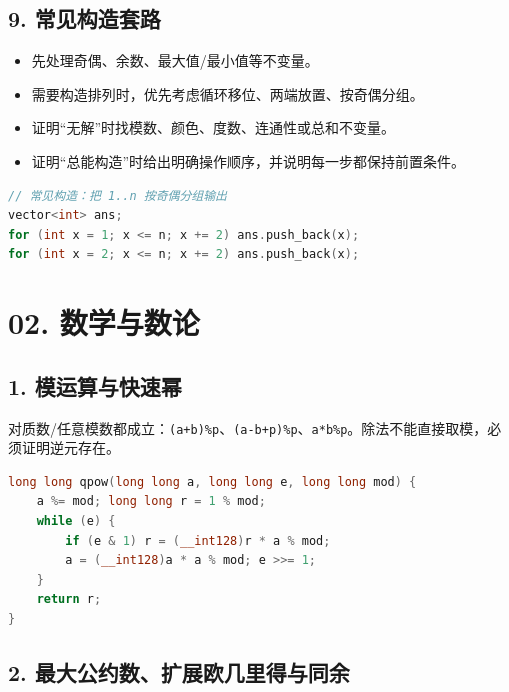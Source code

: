 \section{9. 常见构造套路}\label{ux5e38ux89c1ux6784ux9020ux5957ux8def}

\begin{itemize}
\tightlist
\item
  先处理奇偶、余数、最大值/最小值等不变量。
\item
  需要构造排列时，优先考虑循环移位、两端放置、按奇偶分组。
\item
  证明``无解''时找模数、颜色、度数、连通性或总和不变量。
\item
  证明``总能构造''时给出明确操作顺序，并说明每一步都保持前置条件。
\end{itemize}

\begin{lstlisting}[language={C++}]
// 常见构造：把 1..n 按奇偶分组输出
vector<int> ans;
for (int x = 1; x <= n; x += 2) ans.push_back(x);
for (int x = 2; x <= n; x += 2) ans.push_back(x);
\end{lstlisting}

\chapter{02. 数学与数论}\label{ux6570ux5b66ux4e0eux6570ux8bba}

\section{1. 模运算与快速幂}\label{ux6a21ux8fd0ux7b97ux4e0eux5febux901fux5e42}

对质数/任意模数都成立：\passthrough{\lstinline!(a+b)\%p!}、\passthrough{\lstinline!(a-b+p)\%p!}、\passthrough{\lstinline!a*b\%p!}。除法不能直接取模，必须证明逆元存在。

\begin{lstlisting}[language={C++}]
long long qpow(long long a, long long e, long long mod) {
    a %= mod; long long r = 1 % mod;
    while (e) {
        if (e & 1) r = (__int128)r * a % mod;
        a = (__int128)a * a % mod; e >>= 1;
    }
    return r;
}
\end{lstlisting}

\section{2. 最大公约数、扩展欧几里得与同余}\label{ux6700ux5927ux516cux7ea6ux6570ux6269ux5c55ux6b27ux51e0ux91ccux5f97ux4e0eux540cux4f59}

